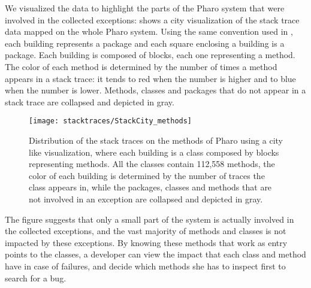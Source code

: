 We visualized the data to highlight the parts of the Pharo system that were involved in the collected exceptions:  shows a city visualization of the stack trace data mapped on the whole Pharo system.
Using the same convention used in , each building represents a package and each square enclosing a building is a package.
Each building is composed of blocks, each one representing a method.
The color of each method is determined by the number of times a method appears in a stack trace: it tends to red when the number is higher and to blue when the number is lower.
Methods, classes and packages that do not appear in a stack trace are collapsed and depicted in gray.

\begin{figure}[h]
\begin{center}
  \texttt{[image: stacktraces/StackCity\_methods]}
  \caption{Distribution of the stack traces on the methods of Pharo using a city like visualization, where each building is a class composed by blocks representing methods.
All the classes contain 112,558 methods, the color of each building is determined by the number of traces the class appears in, while the packages, classes and methods that are not involved in an exception are collapsed and depicted in gray.}
  \label{fig:stackcity-methods}
\end{center}
\end{figure}

The figure suggests that only a small part of the system is actually involved in the collected exceptions, and the vast majority of methods and classes is not impacted by these exceptions.
By knowing these methods that work as entry points to the classes, a developer can view the impact that each class and method have in case of failures, and decide which methods she has to inspect first to search for a bug.

